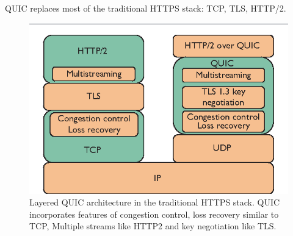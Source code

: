 %
%
%
%
%

\begin{frame}
QUIC replaces most of the traditional HTTPS stack: TCP, TLS, HTTP/2.
\begin{figure}[!t]
    
    \includegraphics[width=1\textwidth]
    {figures/QUICstack.png}
    \endminipage\hfill
    \caption{\label{fig:QUIC_architecture}Layered QUIC architecture in the traditional HTTPS stack. QUIC incorporates features of congestion control, loss recovery similar to TCP, Multiple streams like HTTP2 and key negotiation like TLS.\cite{Cui2017}}
    
\end{figure}
\end{frame}
\clearpage

